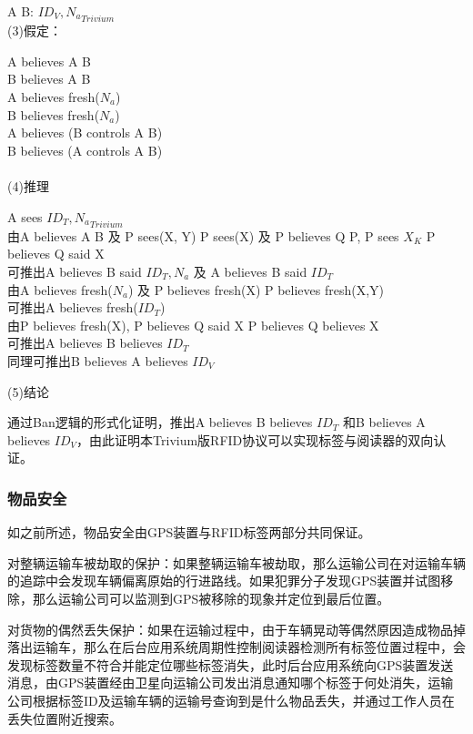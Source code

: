 A \rightarrow B: ${ID_{V}, N_{a}}_{Trivium}$
\\

(3)假定：

A believes A  B \\
B believes A  B \\
A believes fresh($N_{a}$) \\
B believes fresh($N_{a}$) \\
A believes (B controls A  B) \\
B believes (A controls A  B) \\

\\

(4)推理

A sees ${ID_{T}, N_{a}}_{Trivium}$ \\
由A believes A  B 及 P sees(X, Y) \rightarrow P sees(X) 及 P believes Q  P, P sees ${X}_{K}$ \rightarrow P believes Q said X \\
可推出A believes B said {$ID_{T}, N_{a}$} 及 A believes B said $ID_{T}$\\
由A believes fresh($N_{a}$) 及 P believes fresh(X) \rightarrow P believes fresh(X,Y) \\
可推出A believes fresh($ID_{T}$)\\
由P believes fresh(X), P believes Q said X \rightarrow P believes Q believes X \\
可推出A believes B believes $ID_{T}$ \\
同理可推出B believes A believes $ID_{V}$

(5)结论

通过Ban逻辑的形式化证明，推出A believes B believes $ID_{T}$ 和B believes A believes $ID_{V}$，由此证明本Trivium版RFID协议可以实现标签与阅读器的双向认证。



\subsubsection{物品安全}

如之前所述，物品安全由GPS装置与RFID标签两部分共同保证。

对整辆运输车被劫取的保护：如果整辆运输车被劫取，那么运输公司在对运输车辆的追踪中会发现车辆偏离原始的行进路线。如果犯罪分子发现GPS装置并试图移除，那么运输公司可以监测到GPS被移除的现象并定位到最后位置。

对货物的偶然丢失保护：如果在运输过程中，由于车辆晃动等偶然原因造成物品掉落出运输车，那么在后台应用系统周期性控制阅读器检测所有标签位置过程中，会发现标签数量不符合并能定位哪些标签消失，此时后台应用系统向GPS装置发送消息，由GPS装置经由卫星向运输公司发出消息通知哪个标签于何处消失，运输公司根据标签ID及运输车辆的运输号查询到是什么物品丢失，并通过工作人员在丢失位置附近搜索。

